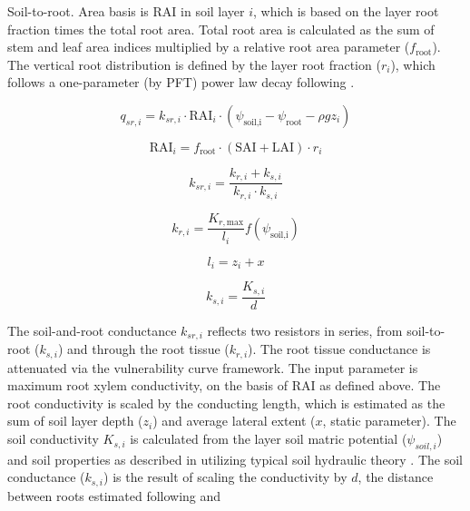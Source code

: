 \documentclass[draft,linenumbers]{agujournal}
\begin{document}
Soil-to-root. Area basis is RAI in soil layer $i$, which is based on the layer root fraction times the
total root area. Total root area is calculated as the sum of stem and leaf area indices multiplied by a relative
root area parameter ($f_{\text{root}}$).
The vertical root distribution is defined by the layer root fraction ($r_i$), which follows a one-parameter 
(by PFT) power law decay following \citet{jackson1996}.

\begin{linenomath*} \begin{equation}
q_{sr,i} = k_{sr,i} \cdot  \text{RAI}_i  \cdot \left( \psi_{\text{soil,i}}-\psi_{\text{root}}-\rho g z_i\right)
\end{equation} \end{linenomath*}
\begin{linenomath*} \begin{equation}
\text{RAI}_i=f_{\text{root}} \cdot \left( \text{SAI} + \text{LAI} \right) \cdot r_i
\label{eq:rai}
\end{equation} \end{linenomath*}
\begin{linenomath*} \begin{equation}
k_{sr,i} = \dfrac{k_{r,i}+k_{s,i}}{k_{r,i}\cdot k_{s,i}}
\end{equation} \end{linenomath*}
\begin{linenomath*} \begin{equation}
k_{r,i} = \dfrac{K_{r,\text{max}}}{l_i} f \left(\psi_{\text{soil,i}}\right)
\end{equation} \end{linenomath*}
\begin{linenomath*} \begin{equation}
l_i = z_i + x
\end{equation} \end{linenomath*}
\begin{linenomath*} \begin{equation}
k_{s,i} = \dfrac{K_{s,i}}{d}
\end{equation} \end{linenomath*}

The soil-and-root conductance $k_{sr,i}$ reflects two resistors in series, from soil-to-root ($k_{s,i}$) and through the
root tissue ($k_{r,i}$).
The root tissue conductance is attenuated via the vulnerability curve framework. 
The input parameter is maximum root xylem conductivity, on the basis of RAI as defined above.
The root conductivity is scaled by the conducting length, which is estimated as the sum of soil layer depth ($z_i$)
and average lateral extent ($x$, static parameter).
The soil conductivity $K_{s,i}$ is calculated from the layer soil matric potential ($\psi_{soil,i}$) 
and soil properties as described in \citet{oleson2013} utilizing typical soil hydraulic theory \citep{brooks1964,clapp1978}.
The soil conductance ($k_{s,i}$) is the result of scaling the conductivity by $d$, 
 the distance between roots estimated following \citet{williams1996} and \citet{bonan2014}
\end{document}
